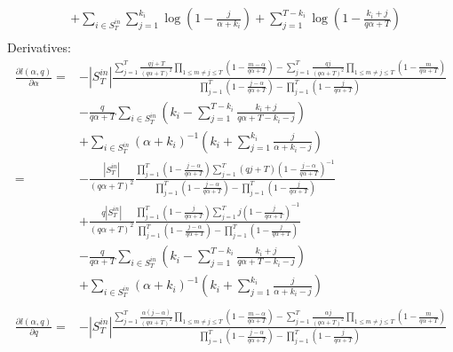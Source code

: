 \documentclass[a4paper, 12pt]{article}
\begin{document}
\begin{itemize}
\begin{align}
        &+ \sum_{i \in S_T^{in}}\sum_{j = 1}^{k_i} \log(1 - \frac{j}{\alpha + k_i}) + \sum_{j = 1}^{T - k_i} \log(1 - \frac{k_i + j}{q\alpha + T}) \nonumber \\
    \end{align}
    Derivatives:
    \begin{align} \label{eq:6}
        \frac{\partial l(\alpha, q)}{\partial \alpha} =& -|S_T^{in}| \frac{\sum_{j = 1}^{T} \frac{qj + T}{(q\alpha + T)^2}\prod_{1 \leq m \neq j \leq T} (1 - \frac{m - \alpha}{q\alpha + T}) - \sum_{j = 1}^{T} \frac{qj}{(q\alpha + T)^2} \prod_{1 \leq m \neq j \leq T} (1 - \frac{m}{q\alpha + T})}{\prod_{j=1}^T (1 - \frac{j - \alpha}{q\alpha + T}) - \prod_{j=1}^T (1 - \frac{j}{q\alpha + T})}\nonumber \\
        &- \frac{q}{q\alpha + T} \sum_{i \in S_T^{in}} \left( k_i - \sum_{j = 1}^{T - k_i} \frac{k_i + j}{q\alpha + T - k_i - j} \right) \nonumber \\
        &+ \sum_{i \in S_T^{in}} (\alpha + k_i)^{-1}\left(k_i + \sum_{j = 1}^{k_i} \frac{j}{\alpha + k_i - j}\right) \nonumber \\
        =& - \frac{|S_T^{in}|}{(q\alpha + T)^2} \frac{\prod_{j = 1}^{T} (1 - \frac{j - \alpha}{q\alpha + T}) \sum_{j = 1}^{T} (qj + T) (1 - \frac{j - \alpha}{q\alpha + T})^{-1} }{ \prod_{j=1}^T (1 - \frac{j - \alpha}{q\alpha + T}) - \prod_{j=1}^T (1 - \frac{j}{q\alpha + T})} \nonumber \\
        &+ \frac{q|S_T^{in}|}{(q\alpha + T)^2} \frac{ \prod_{j = 1}^{T} (1 - \frac{j}{q\alpha + T})\sum_{j = 1}^{T} j(1 - \frac{j}{q\alpha + T})^{-1} }{ \prod_{j=1}^T (1 - \frac{j - \alpha}{q\alpha + T}) - \prod_{j=1}^T (1 - \frac{j}{q\alpha + T})} \nonumber \\
        &- \frac{q}{q\alpha + T} \sum_{i \in S_T^{in}} \left( k_i - \sum_{j = 1}^{T - k_i} \frac{k_i + j}{q\alpha + T - k_i - j} \right) \nonumber \\
        &+ \sum_{i \in S_T^{in}} (\alpha + k_i)^{-1}\left(k_i + \sum_{j = 1}^{k_i} \frac{j}{\alpha + k_i - j}\right) \nonumber \\
    \end{align}
    \begin{align}
        \frac{\partial l(\alpha, q)}{\partial q} =& -|S_T^{in}| \frac{\sum_{j = 1}^T \frac{\alpha(j - \alpha)}{(q\alpha + T)^2} \prod_{1 \leq m \neq j \leq T} (1 - \frac{m - \alpha}{q\alpha + T}) - \sum_{j = 1}^{T} \frac{\alpha j}{(q\alpha + T)^2}\prod_{1 \leq m \neq j \leq T} (1 - \frac{m}{q\alpha + T})}{\prod_{j=1}^T (1 - \frac{j - \alpha}{q\alpha + T}) - \prod_{j=1}^T (1 - \frac{j}{q\alpha + T})}\nonumber \\

\end{align}
\end{itemize}
\end{document}
